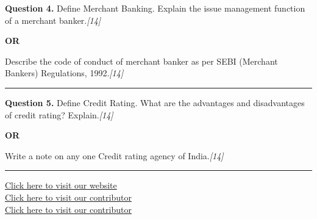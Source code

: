 \documentclass[11pt,a4paper]{article}
\newcommand{\pts}[1]{\hfill   \textit{[#1]}}
\begin{document}
\noindent   \textbf{Question 4.}
Define Merchant Banking. Explain the issue management function of a merchant banker.\pts{14}

\centerline{   \textbf{OR}}

Describe the code of conduct of merchant banker as per SEBI (Merchant Bankers) Regulations, 1992.\pts{14}

\medskip\rule{\linewidth}{0.2pt}




\noindent   \textbf{Question 5.}
Define Credit Rating. What are the advantages and disadvantages of credit rating? Explain.\pts{14}

\centerline{   \textbf{OR}}

Write a note on any one Credit rating agency of India.\pts{14}

\vfill
\rule{\linewidth}{0.4pt}

\begin{center}\small
\href{https://bhu-exam.vercel.app/}{Click here to visit our website}\\[4pt]
\href{https://me-aryan.vercel.app/}{Click here to visit our contributor}\\[4pt]
\href{https://quashan-me.vercel.app/}{Click here to visit our contributor}
\end{center}
\end{document}
